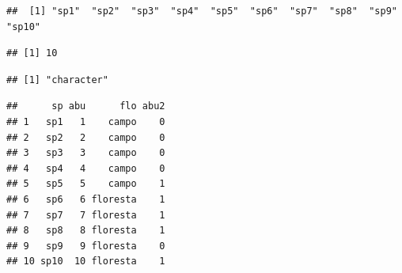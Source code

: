 \documentclass[
]{article}
\newenvironment{Shaded}{\begin{snugshade}}{\end{snugshade}}
\newcommand{\AttributeTok}[1]{\textcolor[rgb]{0.13,0.29,0.53}{#1}}
\newcommand{\ConstantTok}[1]{\textcolor[rgb]{0.56,0.35,0.01}{#1}}
\newcommand{\DecValTok}[1]{\textcolor[rgb]{0.00,0.00,0.81}{#1}}
\newcommand{\DocumentationTok}[1]{\textcolor[rgb]{0.56,0.35,0.01}{\textbf{\textit{#1}}}}
\newcommand{\FunctionTok}[1]{\textcolor[rgb]{0.13,0.29,0.53}{\textbf{#1}}}
\newcommand{\NormalTok}[1]{#1}
\newcommand{\OtherTok}[1]{\textcolor[rgb]{0.56,0.35,0.01}{#1}}
\newcommand{\SpecialCharTok}[1]{\textcolor[rgb]{0.81,0.36,0.00}{\textbf{#1}}}
\begin{document}
\begin{verbatim}
##  [1] "sp1"  "sp2"  "sp3"  "sp4"  "sp5"  "sp6"  "sp7"  "sp8"  "sp9"  "sp10"
\end{verbatim}

\begin{Shaded}
\end{Shaded}

\begin{verbatim}
## [1] 10
\end{verbatim}

\begin{Shaded}
\end{Shaded}

\begin{verbatim}
## [1] "character"
\end{verbatim}

\begin{Shaded}
\end{Shaded}

\begin{verbatim}
##      sp abu      flo abu2
## 1   sp1   1    campo    0
## 2   sp2   2    campo    0
## 3   sp3   3    campo    0
## 4   sp4   4    campo    0
## 5   sp5   5    campo    1
## 6   sp6   6 floresta    1
## 7   sp7   7 floresta    1
## 8   sp8   8 floresta    1
## 9   sp9   9 floresta    0
## 10 sp10  10 floresta    1
\end{verbatim}
\end{document}
